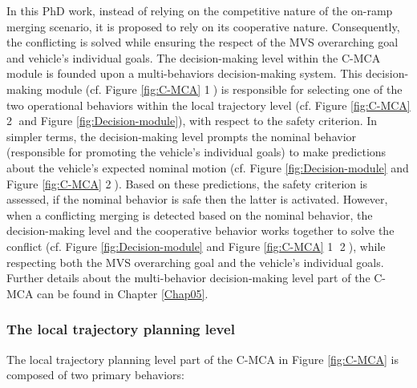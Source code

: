 In this PhD work, instead of relying on the competitive nature of the on-ramp merging scenario, it is proposed to rely on its cooperative nature. Consequently, the conflicting is solved while ensuring the respect of the MVS overarching goal and vehicle's individual goals. The decision-making level within the C-MCA module is founded upon a multi-behaviors decision-making system. This decision-making module (cf. Figure \ref{fig:C-MCA} \textcircled{1}) is responsible for selecting one of the two operational behaviors within the local trajectory level (cf. Figure \ref{fig:C-MCA} \textcircled{2} and Figure \ref{fig:Decision-module}), with respect to the safety criterion. In simpler terms, the decision-making level prompts the nominal behavior (responsible for promoting the vehicle's individual goals) to make predictions about the vehicle's expected nominal motion (cf. Figure \ref{fig:Decision-module} and Figure \ref{fig:C-MCA} \textcircled{2}). Based on these predictions, the safety criterion is assessed, if the nominal behavior is safe then the latter is activated. However, when a conflicting merging is detected based on the nominal behavior, the decision-making level and the cooperative behavior works together to solve the conflict (cf. Figure \ref{fig:Decision-module} and Figure \ref{fig:C-MCA} \textcircled{1} \textcircled{2}), while respecting both the MVS overarching goal and the vehicle's  individual goals. Further details about the multi-behavior decision-making level part of the C-MCA can be found in Chapter \ref{Chap05}. 





















\subsubsection{The local trajectory planning level} \label{sec:local_planning}
The local trajectory planning level part of the C-MCA in Figure \ref{fig:C-MCA} is composed of two primary behaviors: 

